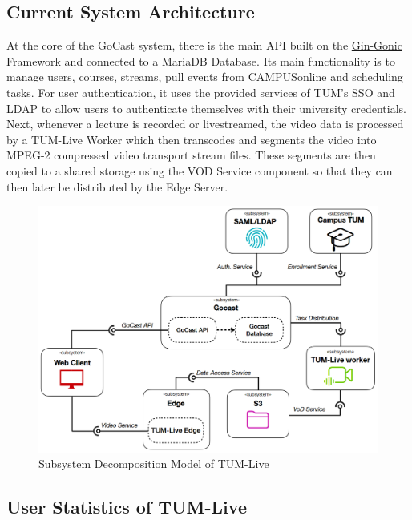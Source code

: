 \subsection{Current System Architecture}

At the core of the GoCast system, there is the main \ac{API} built on the \href{https://github.com/gin-gonic/gin}{Gin-Gonic} Framework and connected to a \href{https://mariadb.org/}{MariaDB} Database. Its main functionality is to manage users, courses, streams, pull events from CAMPUSonline and scheduling tasks. For user authentication, it uses the provided services of \ac{TUM}'s \ac{SSO} and \ac{LDAP} to allow users to authenticate themselves with their university credentials. 
Next, whenever a lecture is recorded or livestreamed, the video data is processed by a TUM-Live Worker which then transcodes and segments the video into MPEG-2 compressed video transport stream files. These segments are then copied to a shared storage using the VOD Service component so that they can then later be distributed by the Edge Server.

\begin{figure}[htpb]
    \centering
    \includegraphics[width=420pt]{images/OldDeploymentDiagram2.png}
    \caption[Subsystem Decomposition]{Subsystem Decomposition Model of TUM-Live}\label{fig:old-system-architecture}
\end{figure}

\subsection{User Statistics of TUM-Live}\label{subsection:user-stats-tumlive}

